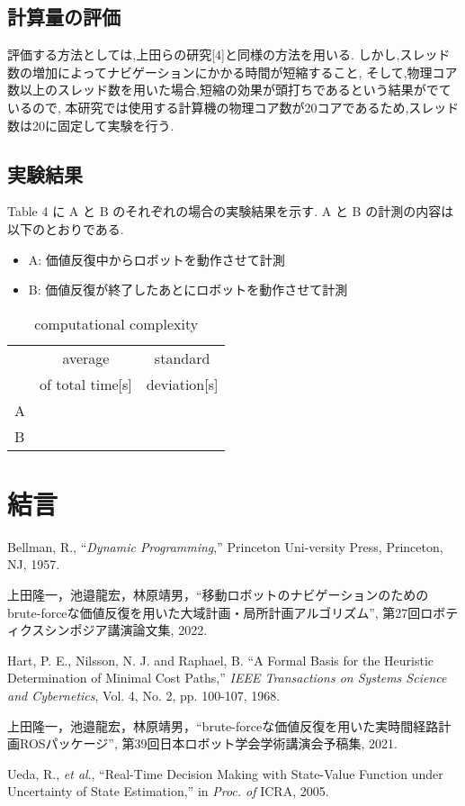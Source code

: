 \documentclass{jarticle}
\begin{document}
\subsection{計算量の評価}
評価する方法としては,上田らの研究[4]と同様の方法を用いる.
しかし,スレッド数の増加によってナビゲーションにかかる時間が短縮すること,
そして,物理コア数以上のスレッド数を用いた場合,短縮の効果が頭打ちであるという結果がでているので,
本研究では使用する計算機の物理コア数が20コアであるため,スレッド数は20に固定して実験を行う.
\subsection{実験結果}
Table 4 に A と B のそれぞれの場合の実験結果を示す.
A と B の計測の内容は以下のとおりである.
\begin{itemize}
	\item A: 価値反復中からロボットを動作させて計測
	\item B: 価値反復が終了したあとにロボットを動作させて計測
 \end{itemize}
\begin{table}[hbtp]
	\caption{computational complexity}
	\centering
	 \begin{tabular}{l|cc}
		\hline
		 & average & standard \\
		 & of total time[s] & deviation[s] \\
		\hline \hline
		A &  &  \\
		B &  &  \\
		\hline
	 \end{tabular}
 \end{table}
\section{結言}%




\footnotesize
\begin{thebibliography}{99}

	Bellman, R., ``{\it Dynamic Programming},'' Princeton Uni-versity Press, Princeton, NJ, 1957.

	上田隆一，池邉龍宏，林原靖男，``移動ロボットのナビゲーションのためのbrute-forceな価値反復を用いた大域計画・局所計画アルゴリズム'', 
	第27回ロボティクスシンポジア講演論文集, 2022.
	
	Hart, P. E., Nilsson, N. J. and Raphael, B. ``A Formal
	Basis for the Heuristic Determination of Minimal Cost
	Paths,'' {\it IEEE Transactions on Systems Science and Cybernetics}, Vol. 4, No. 2, pp. 100-107, 1968.
	
	上田隆一，池邉龍宏，林原靖男，``brute-forceな価値反復を用いた実時間経路計画ROSパッケージ'', 
	第39回日本ロボット学会学術講演会予稿集, 2021.

	Ueda, R., {\it et al}., ``Real-Time Decision Making with State-Value Function under Uncertainty of State Estimation,''
	 in {\it Proc. of} ICRA, 2005.

\end{thebibliography}

\normalsize
\end{document}
